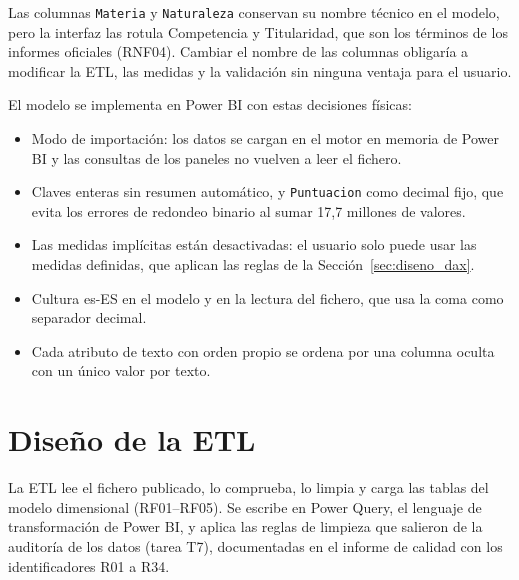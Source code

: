 \documentclass[12pt, a4paper, oneside]{report}
\begin{document}
Las columnas \texttt{Materia} y \texttt{Naturaleza} conservan su nombre técnico en el modelo, pero la interfaz las rotula \guillemotleft{}Competencia\guillemotright{} y \guillemotleft{}Titularidad\guillemotright{}, que son los términos de los informes oficiales (RNF04). Cambiar el nombre de las columnas obligaría a modificar la ETL, las medidas y la validación sin ninguna ventaja para el usuario.

El modelo se implementa en Power BI con estas decisiones físicas:
\begin{itemize}
    \item Modo de importación: los datos se cargan en el motor en memoria de Power BI y las consultas de los paneles no vuelven a leer el fichero.
    \item Claves enteras sin resumen automático, y \texttt{Puntuacion} como decimal fijo, que evita los errores de redondeo binario al sumar 17,7 millones de valores.
    \item Las medidas implícitas están desactivadas: el usuario solo puede usar las medidas definidas, que aplican las reglas de la Sección~\ref{sec:diseno_dax}.
    \item Cultura es-ES en el modelo y en la lectura del fichero, que usa la coma como separador decimal.
    \item Cada atributo de texto con orden propio se ordena por una columna oculta con un único valor por texto.
\end{itemize}

\section{Diseño de la ETL}
\label{sec:diseno_etl}
La ETL lee el fichero publicado, lo comprueba, lo limpia y carga las tablas del modelo dimensional (RF01--RF05). Se escribe en Power Query, el lenguaje de transformación de Power BI, y aplica las reglas de limpieza que salieron de la auditoría de los datos (tarea T7), documentadas en el informe de calidad con los identificadores R01 a R34.
\end{document}
